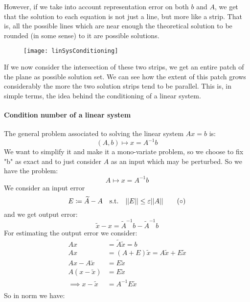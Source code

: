 However, if we take into account representation error on both $b$ and $A$, we get that the solution to each equation is not just a line, but more like a strip. That is, all the possible lines which are near enough the theoretical solution to be rounded (in some sense) to it are possible solutions.
\begin{figure}[H]
	\texttt{[image: linSysConditioning]}
\end{figure}
If we now consider the intersection of these two strips, we get an entire patch of the plane as possible solution set. We can see how the extent of this patch grows considerably the more the two solution strips tend to be parallel. This is, in simple terms, the idea behind the conditioning of a linear system.

\paragraph{Condition number of a linear system}
The general problem associated to solving the linear system $Ax = b$ is:
\begin{equation*}
	(A, b) \mapsto x = A^{-1} b
\end{equation*}
We want to simplify it and make it a mono-variate problem, so we choose to fix "b" as exact and to just consider $A$ as an input which may be perturbed. So we have the problem:
\begin{equation*}
	A \mapsto x = A^{-1} b
\end{equation*}
We consider an input error
\begin{equation}\label{eq:error}
{
	E \definedas \tilde{A} - A \st ||E|| \leq \eps||A|| \tag{\ensuremath{\circ}}
}
\end{equation}
and we get output error:
\begin{equation*}
	\tilde{x} - x = \tilde{A}^{-1} b - \tilde{A}^{-1} b
\end{equation*}
For estimating the output error we consider:
\begin{align*}
	Ax &= \tilde{A} \tilde{x} = b\\
	Ax &= (A+E) \tilde{x} = A \tilde{x} + E \tilde{x}\\
	Ax - A \tilde{x} &= E \tilde{x}\\
	A(x - \tilde{x}) &= E \tilde{x}\\
	\implies x - \tilde{x} &= A^{-1} E \tilde{x}\\
\end{align*}
So in norm we have:
